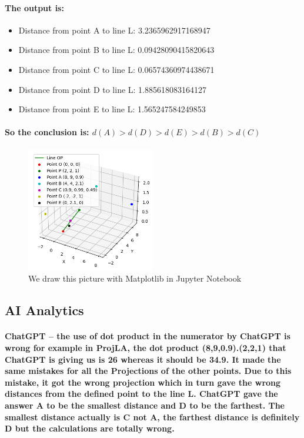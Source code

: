 \documentclass[11pt]{article} %
\begin{document}
\paragraph{The output is: }
\begin{itemize}
    \item Distance from point A to line L: 3.2365962917168947
    \item Distance from point B to line L: 0.09428090415820643
    \item Distance from point C to line L: 0.06574360974438671
    \item Distance from point D to line L: 1.885618083164127
    \item Distance from point E to line L: 1.565247584249853
\end{itemize}

\paragraph{\textbf{So the conclusion is: $d(A)>d(D)>d(E)>d(B)>d(C)$}}


% 
\begin{figure}[H]
    \centering
    \includegraphics[width=0.5\textwidth]{pic/DrawPlot.png}
    \caption{We draw this picture with Matplotlib in Jupyter Notebook}
\end{figure}
% 
% 
% 
\subsection{AI Analytics}
\paragraph{\textbf{ChatGPT} – the use of dot product in the numerator by ChatGPT is wrong for example in ProjLA, the dot product (8,9,0.9).(2,2,1) that ChatGPT is giving us is 26 whereas it should be 34.9. It made the same mistakes for all the Projections of the other points. Due to this mistake, it got the wrong projection which in turn gave the wrong distances from the defined point to the line L. ChatGPT gave the answer A to be the smallest distance and D to be the farthest. The smallest distance actually is C not A, the farthest distance is definitely D but the calculations are totally wrong.}
\end{document}
